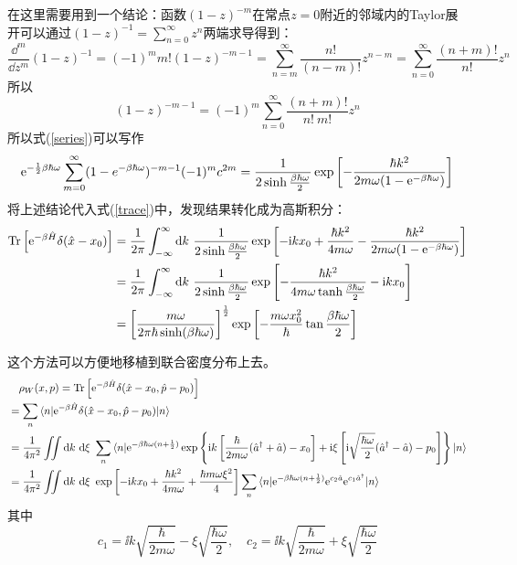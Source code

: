     在这里需要用到一个结论：函数\((1-z)^{-m}\)在常点\(z = 0\)附近的邻域内的Taylor展开可以通过\((1-z)^{-1} = \sum_{n = 0}^{\infty} z^n\)两端求导得到：
    \[
        \frac{\dd^m}{\dd z^m}(1-z)^{-1} = (-1)^m m! (1-z)^{-m-1} = \sum_{n = m}^\infty \frac{n!}{(n-m)!}z^{n-m} = \sum_{n=0}^\infty \frac{(n+m)!}{n!}z^n
    \]
    所以\[(1-z)^{-m-1} = (-1)^m \sum_{n=0}^{\infty} \frac{(n+m)!}{n!~m!}z^n\]
    所以式(\ref{series})可以写作
    \[
        \mathrm{e}^{-\frac{1}{2}\beta\hbar\omega} \sum_{m=0}^{\infty} (1 - e^{-\beta\hbar\omega})^{-m-1} (-1)^m c^{2m} = \frac{1}{2\sinh \frac{\beta\hbar\omega}{2}} \exp\left[-\frac{\hbar k^2}{2m\omega(1-\mathrm{e}^{-\beta\hbar\omega})}\right]
    \]
    将上述结论代入式(\ref{trace})中，发现结果转化成为高斯积分：
    \[
        \begin{aligned}
        \textrm{Tr}\left[\mathrm{e}^{-\beta \hat{H}}\delta(\hat{x} - x_0)\right] 
        &= \frac{1}{2\pi} \int_{-\infty}^{\infty} \mathrm{d} k ~\frac{1}{2\sinh \frac{\beta\hbar\omega}{2}} \exp \left[-\mathrm{i} kx_0 + \frac{\hbar k^2}{4m\omega} - \frac{\hbar k^2}{2m\omega(1-\mathrm{e}^{-\beta\hbar\omega})} \right]
        \\ &=  \frac{1}{2\pi} \int_{-\infty}^{\infty} \mathrm{d} k ~\frac{1}{2\sinh \frac{\beta\hbar\omega}{2}} \exp \left[-\frac{\hbar k^2}{4m\omega \tanh \frac{\beta\hbar\omega}{2}} - \mathrm{i} kx_0\right]
        \\ &= \left[\frac{m\omega}{2\pi\hbar\sinh(\beta\hbar\omega)}\right]^{\frac{1}{2}}\exp \left[-\frac{m\omega x_0^2}{\hbar}\tan{\frac{\beta\hbar\omega}{2}}\right]
        \end{aligned}
    \]

    这个方法可以方便地移植到联合密度分布上去。
    \[
    \begin{aligned}
        &\quad \rho_W(x, p) = \textrm{Tr}\left[\mathrm{e}^{-\beta \hat{H}}\delta(\hat{x} - x_0, \hat{p} - p_0)\right] 
        \\ &= \sum_n \braket{n | \mathrm{e}^{-\beta \hat{H}}\delta(\hat{x} - x_0, \hat{p} - p_0) | n}
        \\ &= \frac{1}{4\pi^2} \iint \mathrm{d} k ~\mathrm{d} \xi ~\sum_n \braket{n |  \mathrm{e}^{-\beta\hbar\omega(n+\frac{1}{2})} \exp\left\{\mathrm{i} k \left[\frac{\hbar}{2m\omega}(\hat{a}^\dagger + \hat{a}) - x_0\right] + \mathrm{i} \xi \left[\mathrm{i} \sqrt{\frac{\hbar\omega}{2}} (\hat{a}^\dagger - \hat{a}) - p_0 \right]\right\}  | n}
        \\ &= \frac{1}{4\pi^2} \iint \mathrm{d} k ~\mathrm{d} \xi ~\exp\left[-\mathrm{i} k x_0 + \frac{\hbar k^2}{4m\omega} + \frac{\hbar m\omega \xi^2}{4}\right] \sum_n\braket{n | \mathrm{e}^{-\beta\hbar\omega(n+\frac{1}{2})} \mathrm{e}^{c_2\hat{a}} \mathrm{e}^{c_1\hat{a}^\dagger}  | n}
    \end{aligned}
    \] 
    其中\[c_1 = \ii k \sqrt{\frac{\hbar}{2m\omega}} - \xi \sqrt{\frac{\hbar\omega}{2}},\quad c_2 = \ii k \sqrt{\frac{\hbar}{2m\omega}} + \xi \sqrt{\frac{\hbar\omega}{2}}\]

